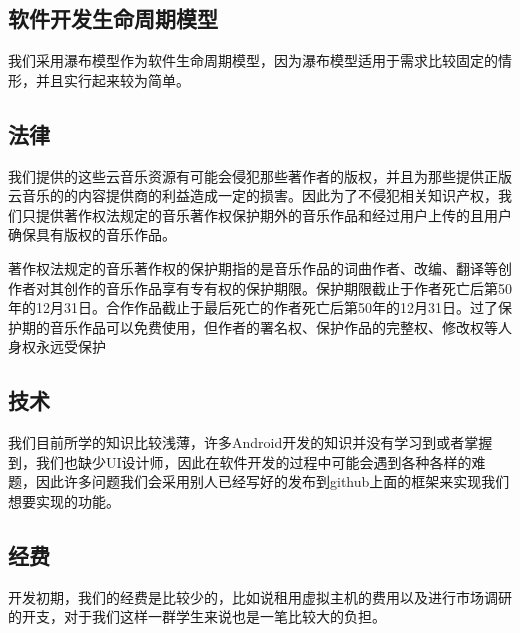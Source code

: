 \subsection{软件开发生命周期模型}
我们采用瀑布模型作为软件生命周期模型，因为瀑布模型适用于需求比较固定的情形，并且实行起来较为简单。  

\subsection{法律}
我们提供的这些云音乐资源有可能会侵犯那些著作者的版权，并且为那些提供正版云音乐的的内容提供商的利益造成一定的损害。因此为了不侵犯相关知识产权，我们只提供著作权法规定的音乐著作权保护期外的音乐作品和经过用户上传的且用户确保具有版权的音乐作品。

著作权法规定的音乐著作权的保护期指的是音乐作品的词曲作者、改编、翻译等创作者对其创作的音乐作品享有专有权的保护期限。保护期限截止于作者死亡后第50年的12月31日。合作作品截止于最后死亡的作者死亡后第50年的12月31日。过了保护期的音乐作品可以免费使用，但作者的署名权、保护作品的完整权、修改权等人身权永远受保护


\subsection{技术}
我们目前所学的知识比较浅薄，许多Android开发的知识并没有学习到或者掌握到，我们也缺少UI设计师，因此在软件开发的过程中可能会遇到各种各样的难题，因此许多问题我们会采用别人已经写好的发布到github上面的框架来实现我们想要实现的功能。  

\subsection{经费}
开发初期，我们的经费是比较少的，比如说租用虚拟主机的费用以及进行市场调研的开支，对于我们这样一群学生来说也是一笔比较大的负担。



